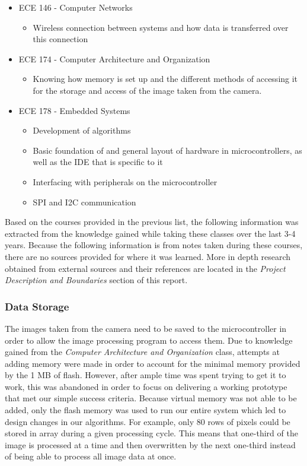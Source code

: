 \begin{itemize}
\begin{itemize}
	\end{itemize}
\item ECE 146 - Computer Networks
	\begin{itemize}
		\item Wireless connection between systems and how data is transferred over this connection
	\end{itemize}
\item ECE 174 - Computer Architecture and Organization
	\begin{itemize}
		\item Knowing how memory is set up and the different methods of accessing it for the storage and access of the image taken from the camera.
	\end{itemize}
\item ECE 178 - Embedded Systems
	\begin{itemize}
		\item Development of algorithms
		\item Basic foundation of and general layout of hardware in microcontrollers, as well as the IDE that is specific to it
		\item Interfacing with peripherals on the microcontroller
		\item SPI and I2C communication
	\end{itemize}
\end{itemize}\par
 
Based on the courses provided in the previous list, the following information was extracted from the knowledge gained while taking these classes over the last 3-4 years. Because the following information is from notes taken during these courses, there are no sources provided for where it was learned. More in depth research obtained from external sources and their references are located in the \textit{Project Description and Boundaries} section of this report.\\

\subsubsection{Data Storage}
The images taken from the camera need to be saved to the microcontroller in order to allow the image processing program to access them. Due to knowledge gained from the \textit{Computer Architecture and Organization} class, attempts at adding memory were made in order to account for the minimal memory provided by the 1 MB of flash. However, after ample time was spent trying to get it to work, this was abandoned in order to focus on delivering a working prototype that met our simple success criteria. Because virtual memory was not able to be added, only the flash memory was used to run our entire system which led to design changes in our algorithms. For example, only 80 rows of pixels could be stored in array during a given processing cycle. This means that one-third of the image is processed at a time and then overwritten by the next one-third instead of being able to process all image data at once.\\
